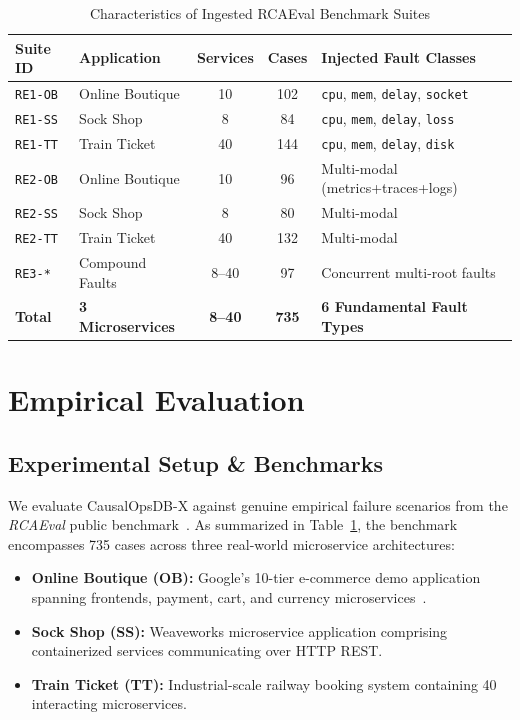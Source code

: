 \documentclass[conference]{IEEEtran}
\begin{document}
\begin{table}[t]
\centering
\caption{Characteristics of Ingested RCAEval Benchmark Suites}
\label{tab:datasets}
\begin{tabular}{@{}llccp{3.2cm}@{}}
\toprule
\textbf{Suite ID} & \textbf{Application} & \textbf{Services} & \textbf{Cases} & \textbf{Injected Fault Classes} \\
\midrule
\texttt{RE1-OB} & Online Boutique & 10 & 102 & \texttt{cpu}, \texttt{mem}, \texttt{delay}, \texttt{socket} \\
\texttt{RE1-SS} & Sock Shop & 8 & 84 & \texttt{cpu}, \texttt{mem}, \texttt{delay}, \texttt{loss} \\
\texttt{RE1-TT} & Train Ticket & 40 & 144 & \texttt{cpu}, \texttt{mem}, \texttt{delay}, \texttt{disk} \\
\texttt{RE2-OB} & Online Boutique & 10 & 96 & Multi-modal (metrics+traces+logs) \\
\texttt{RE2-SS} & Sock Shop & 8 & 80 & Multi-modal \\
\texttt{RE2-TT} & Train Ticket & 40 & 132 & Multi-modal \\
\texttt{RE3-*}  & Compound Faults & 8--40 & 97 & Concurrent multi-root faults \\
\midrule
\textbf{Total} & \textbf{3 Microservices} & \textbf{8--40} & \textbf{735} & \textbf{6 Fundamental Fault Types} \\
\bottomrule
\end{tabular}
\vspace{-1.0em}
\end{table}

\section{Empirical Evaluation}
\subsection{Experimental Setup \& Benchmarks}
We evaluate CausalOpsDB-X against genuine empirical failure scenarios from the \textit{RCAEval} public benchmark~\cite{phamquiluan2024rcaeval}. As summarized in Table~\ref{tab:datasets}, the benchmark encompasses 735 cases across three real-world microservice architectures:
\begin{itemize}
    \item \textbf{Online Boutique (OB):} Google's 10-tier e-commerce demo application spanning frontends, payment, cart, and currency microservices~\cite{onlineboutique2023google}.
    \item \textbf{Sock Shop (SS):} Weaveworks microservice application comprising containerized services communicating over HTTP REST.
    \item \textbf{Train Ticket (TT):} Industrial-scale railway booking system containing 40 interacting microservices.
\end{itemize}
\end{document}
